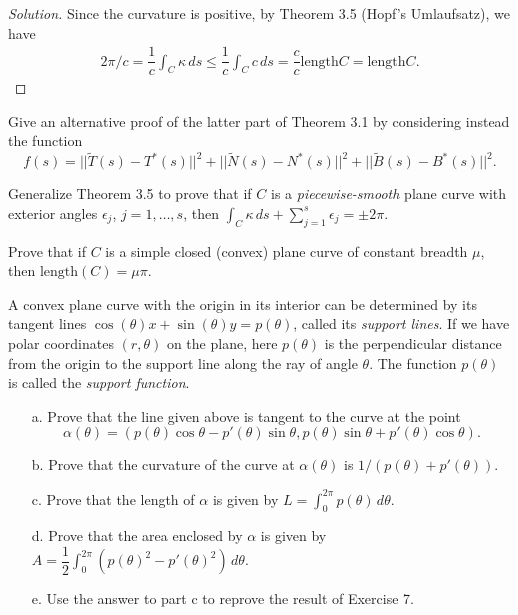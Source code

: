 \documentclass[Shifrin_Solutions_Spring_2015]{subfiles}
\begin{document}
\begin{proof}[Solution] Since the curvature is positive, by Theorem 3.5 (Hopf's Umlaufsatz), we have
\[
\begin{split}
2\pi/c = \dfrac{1}{c}\int_{C} \kappa \, ds \leq \dfrac{1}{c} \int_{C} c\, ds = \dfrac{c}{c}\mathrm{length}{C}=\mathrm{length}{C}.
\end{split}
\]
\end{proof}


\begin{exercise} Give an alternative proof of the latter part of Theorem 3.1 by considering instead the function
\[
f(s) = ||\tilde{T}(s) - T^*(s)||^2 + ||\tilde{N}(s) - N^*(s)||^2 + ||\tilde{B}(s) - B^*(s)||^2 .
\]
\end{exercise}

\begin{exercise} Generalize Theorem 3.5 to prove that if $C$ is a \emph{piecewise-smooth} plane curve with exterior angles $\epsilon_j$, $j=1,\ldots, s$, then $\int_{C} \kappa \, ds + \sum_{j=1}^s \epsilon_j = \pm 2\pi$.
\end{exercise}

\begin{exercise}
Prove that if $C$ is a simple closed (convex) plane curve of constant breadth $\mu$, then $\mathrm{length}(C) = \mu\pi$.
\end{exercise}

\begin{exercise} A convex plane curve with the origin in its interior can be determined by its tangent lines $\cos(\theta)x + \sin(\theta)y = p(\theta)$, called its \emph{support lines}. If we have polar coordinates $(r,\theta)$ on the plane, here $p(\theta)$ is the perpendicular distance from the origin to the support line along the ray of angle $\theta$. The function $p(\theta)$ is called the \emph{support function}.
\begin{itemize}
\item[a.] Prove that the line given above is tangent to the curve at the point
\[
\alpha(\theta) = \left( p(\theta) \cos\theta - p'(\theta) \sin \theta , p(\theta) \sin \theta + p'(\theta) \cos \theta \right) .
\]

\item[b.] Prove that the curvature of the curve at $\alpha(\theta)$ is $1/(p(\theta) + p'(\theta) )$.

\item[c.] Prove that the length of $\alpha$ is given by $L = \int_0^{2\pi} p(\theta) \, d\theta $.

\item[d.] Prove that the area enclosed by $\alpha$ is given by $A= \dfrac{1}{2} \int_0^{2\pi} (p(\theta)^2 - p'(\theta)^2 )\, d\theta$.

\item[e.] Use the answer to part c to reprove the result of Exercise 7.
\end{itemize}
\end{exercise}
\end{document}
